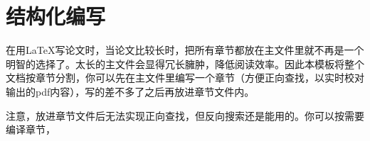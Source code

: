 \section{结构化编写}
在用LaTeX写论文时，当论文比较长时，把所有章节都放在主文件里就不再是一个明智的选择了。太长的主文件会显得冗长臃肿，降低阅读效率。因此本模板将整个文档按章节分割，你可以先在主文件里编写一个章节（方便正向查找，以实时校对输出的pdf内容），写的差不多了之后再放进章节文件内。

注意，放进章节文件后无法实现正向查找，但反向搜索还是能用的。你可以按需要编译章节，


